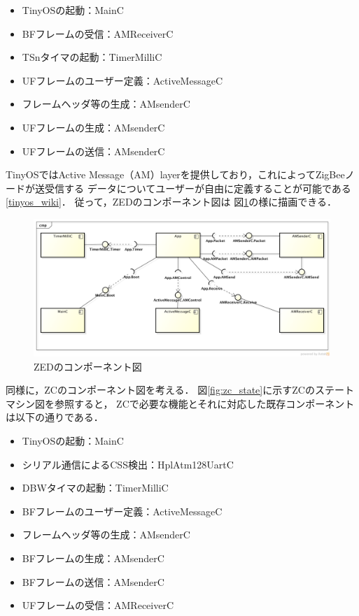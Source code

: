 \documentclass[12pt]{jreport}
\begin{document}
\begin{itemize}
 \item TinyOSの起動：MainC
 \item BFフレームの受信：AMReceiverC
 \item TSnタイマの起動：TimerMilliC
 \item UFフレームのユーザー定義：ActiveMessageC
 \item フレームヘッダ等の生成：AMsenderC
 \item UFフレームの生成：AMsenderC
 \item UFフレームの送信：AMsenderC
\end{itemize}

TinyOSではActive Message（AM）layerを提供しており，これによってZigBeeノードが送受信する
データについてユーザーが自由に定義することが可能である\ref{tinyos_wiki}．
従って，ZEDのコンポーネント図は
図\ref{fig:zed_component}の様に描画できる． \\

\begin{figure}[bt]
 \centering
 \includegraphics[width=\columnwidth]{figure/zed_component.pdf}
 \caption{ZEDのコンポーネント図}
 \label{fig:zed_component}
\end{figure}

同様に，ZCのコンポーネント図を考える．
図\ref{fig:zc_state}に示すZCのステートマシン図を参照すると，
ZCで必要な機能とそれに対応した既存コンポーネントは以下の通りである．

\begin{itemize}
 \item TinyOSの起動：MainC
 \item シリアル通信によるCSS検出：HplAtm128UartC 
 \item DBWタイマの起動：TimerMilliC
 \item BFフレームのユーザー定義：ActiveMessageC
 \item フレームヘッダ等の生成：AMsenderC
 \item BFフレームの生成：AMsenderC
 \item BFフレームの送信：AMsenderC
 \item UFフレームの受信：AMReceiverC
\end{itemize}
\end{document}
